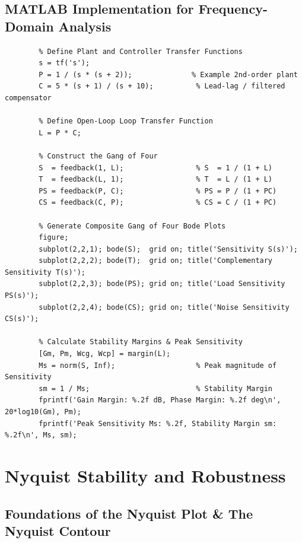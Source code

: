 \documentclass[12pt,onecolumn,twoside ]{article}
\begin{document}
	\subsection{MATLAB Implementation for Frequency-Domain Analysis}
	\begin{lstlisting}
		% Define Plant and Controller Transfer Functions
		s = tf('s');
		P = 1 / (s * (s + 2));              % Example 2nd-order plant
		C = 5 * (s + 1) / (s + 10);          % Lead-lag / filtered compensator
		
		% Define Open-Loop Loop Transfer Function
		L = P * C;
		
		% Construct the Gang of Four
		S  = feedback(1, L);                 % S  = 1 / (1 + L)
		T  = feedback(L, 1);                 % T  = L / (1 + L)
		PS = feedback(P, C);                 % PS = P / (1 + PC)
		CS = feedback(C, P);                 % CS = C / (1 + PC)
		
		% Generate Composite Gang of Four Bode Plots
		figure;
		subplot(2,2,1); bode(S);  grid on; title('Sensitivity S(s)');
		subplot(2,2,2); bode(T);  grid on; title('Complementary Sensitivity T(s)');
		subplot(2,2,3); bode(PS); grid on; title('Load Sensitivity PS(s)');
		subplot(2,2,4); bode(CS); grid on; title('Noise Sensitivity CS(s)');
		
		% Calculate Stability Margins & Peak Sensitivity
		[Gm, Pm, Wcg, Wcp] = margin(L);
		Ms = norm(S, Inf);                   % Peak magnitude of Sensitivity
		sm = 1 / Ms;                         % Stability Margin
		fprintf('Gain Margin: %.2f dB, Phase Margin: %.2f deg\n', 20*log10(Gm), Pm);
		fprintf('Peak Sensitivity Ms: %.2f, Stability Margin sm: %.2f\n', Ms, sm);
	\end{lstlisting}
	
	\newpage
	\section{Nyquist Stability and Robustness}
	
	\subsection{Foundations of the Nyquist Plot \& The Nyquist Contour}
\end{document}
